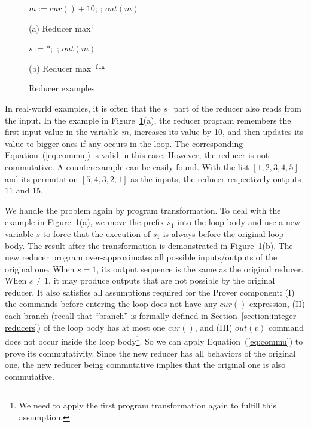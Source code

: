 \documentclass{llncs}
\newcommand{\cur}{cur()}
\begin{document}
\begin{figure}[t]
	\begin{minipage}{0.4\textwidth}
		\begin{algorithm}[H]
			\;\;$m := \cur + 10$; \;
			\Loop{}{
				$t:=\cur$\;
				\uIf{ $t> m$}{
					$m := t$ \;
				}
			};
			$out(m)$\;\;
		\end{algorithm}
		\caption*{(a) Reducer max$^+$}
	\end{minipage}
		\begin{minipage}{0.6\textwidth}
			\begin{algorithm}[H]
				$s:=*;$\;
				\Loop{}{
					\uIf{$s=1$}{$m := \cur + 10; s:= 2$}
					\uElse{
						$t:=\cur$\;
						\uIf{ $t > m$}{
							$m := t$ \;
						}
					}
				};
				$out(m)$
			\end{algorithm}
			\caption*{(b) Reducer max$^{+\mathtt{fix}}$}
		\end{minipage}
	\caption{Reducer examples}
	\label{fig:reducer_max}
\end{figure}





In real-world examples, it is often that the $s_1$ part of the reducer also reads from the input. In the example in Figure~\ref{fig:reducer_max}(a), the reducer program remembers the first input value in the variable $m$, increases its value by 10, and then updates its value to bigger ones if any occurs in the loop. The corresponding Equation~(\ref{eq:commu}) is valid in this case. However, the reducer is not commutative. A counterexample can be easily found. With the list $[1,2,3,4,5]$ and its permutation $[5,4,3,2,1]$ as the inputs, the reducer respectively outputs $11$ and $15$. 

We handle the problem again by program transformation. To deal with the example in Figure~\ref{fig:reducer_max}(a), we move the prefix $s_1$ into the loop body and use a new variable $s$ to force that the execution of $s_1$ is always before the original loop body. The result after the transformation is demonstrated in Figure~\ref{fig:reducer_max}(b). The new reducer program over-approximates all possible inputs/outputs of the original one. When $s=1$, its output sequence is the same as the original reducer. When $s\neq 1$, it may produce outputs that are not possible by the original reducer.
It also satisfies all assumptions required for the Prover component: 
(I) the commands before entering the loop does not have any $\cur$ expression, 
(II) each branch (recall that ``branch'' is formally defined in Section~\ref{section:integer-reducers}) of the loop body has at most one $\cur$, and 
(III) $out(v)$ command does not occur inside the loop body\footnote{We need to apply the first program transformation again to fulfill this assumption.}. So we can apply Equation~(\ref{eq:commu}) to prove its commutativity.
Since the new reducer has all behaviors of the original one, the new reducer being commutative implies that the original one is also commutative. 
\end{document}
